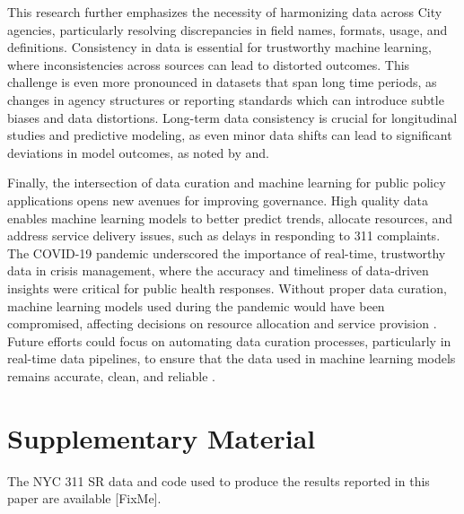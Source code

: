 \documentclass[linenumber]{jdsart}
\begin{document}
This research further emphasizes the necessity of harmonizing data
across City agencies, particularly resolving discrepancies in field
names, formats, usage, and definitions. Consistency in data is essential for
trustworthy machine learning, where inconsistencies across sources can
lead to distorted outcomes. This challenge is even more pronounced in
datasets that span long time periods, as changes in agency structures
or reporting standards which can introduce subtle biases and data 
distortions. Long\mbox{-}term data consistency is crucial for 
longitudinal studies and predictive modeling, as even minor 
data shifts can lead to significant deviations in model outcomes, 
as noted by \citet{rahm2000data} and\citet{borgman2012conundrum}.


Finally, the intersection of data curation and machine learning for
public policy applications opens new avenues for improving governance.
High quality data enables machine learning models to better predict
trends, allocate resources, and address service delivery issues, such
as delays in responding to 311 complaints. The COVID\mbox{-}19 pandemic
underscored the importance of real\mbox{-}time, trustworthy data in crisis
management, where the accuracy and timeliness of data\mbox{-}driven insights
were critical for public health responses. Without proper data
curation, machine learning models used during the pandemic would have
been compromised, affecting decisions on resource allocation and
service provision \citep{worby2020face, khemasuwan2021applications}.
Future efforts could focus on automating data curation processes,
particularly in real\mbox{-}time data pipelines, to ensure that the data used
in machine learning models remains accurate, clean, and reliable
\citep{chu2016data, hurbean2021open}.


\section*{Supplementary Material}
The NYC 311 SR data and code used to produce the results reported in
this paper are available [FixMe].




\end{document}
